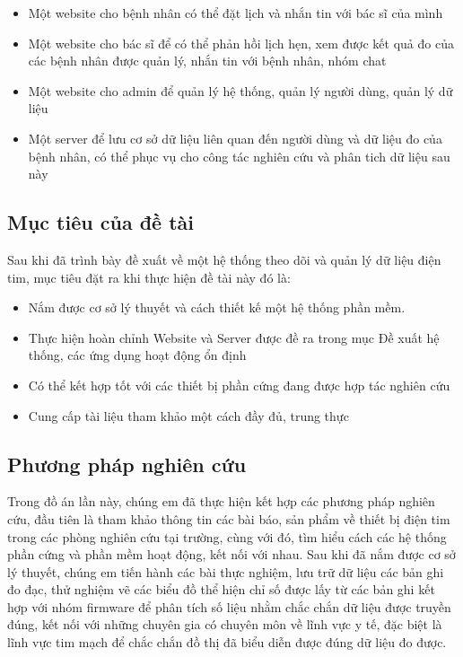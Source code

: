 \begin{adjustwidth}{1.5em}{}
  \begin{itemize}
     
      \item Một website cho bệnh nhân có thể đặt lịch và nhắn tin với bác sĩ của mình
      \item Một website cho bác sĩ để có thể phản hồi lịch hẹn, xem được kết quả đo của các bệnh nhân được quản lý, nhắn tin với bệnh nhân, nhóm chat
      \item Một website cho admin để quản lý hệ thống, quản lý người dùng, quản lý dữ liệu
      \item Một server để lưu cơ sở dữ liệu liên quan đến người dùng và dữ liệu đo của bệnh nhân, có thể phục vụ cho công tác nghiên cứu và phân tich dữ liệu sau này

  \end{itemize}
  \end{adjustwidth}


\subsection*{Mục tiêu của đề tài}
Sau khi đã trình bày đề xuất về một hệ thống theo dõi và quản lý dữ liệu điện tim, mục tiêu đặt ra khi thực hiện
đề tài này đó là:

\begin{adjustwidth}{1.5em}{}
  \begin{itemize}
      \item Nắm được cơ sở lý thuyết và cách thiết kế một hệ thống phần mềm.
      \item Thực hiện hoàn chỉnh Website và Server được đề ra trong mục Đề xuất hệ thống, các ứng dụng hoạt động ổn định
      \item Có thể kết hợp tốt với các thiết bị phần cứng đang được hợp tác nghiên cứu
      \item Cung cấp tài liệu tham khảo một cách đầy đủ, trung thực

  \end{itemize}
  \end{adjustwidth}





\subsection*{Phương pháp nghiên cứu}
Trong đồ án lần này, chúng em đã thực hiện kết hợp các phương pháp nghiên cứu, đầu tiên là tham khảo thông tin các bài
báo, sản phẩm về thiết bị điện tim trong các phòng nghiên cứu tại trường, cùng với đó, tìm hiểu cách các hệ thống phần cứng và phần mềm hoạt động,
kết nối với nhau. Sau khi đã nắm được cơ sở lý thuyết, chúng em tiến hành các bài thực nghiệm, lưu trữ dữ liệu các bản ghi đo đạc, thử nghiệm vẽ các biểu đồ thể hiện chỉ số được lấy từ các bản ghi
kết hợp với nhóm firmware để phân tích số liệu nhằm chắc chắn dữ liệu được truyền đúng, kết nối với những chuyên gia có chuyên môn về lĩnh vực y tế, đặc biệt là lĩnh vực tim mạch để chắc chắn đồ thị đã biểu diễn được đúng dữ liệu đo được.

